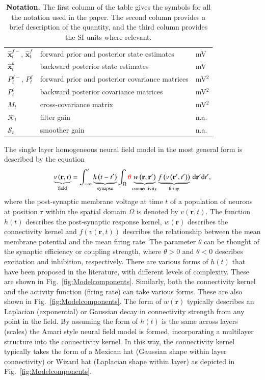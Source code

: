 \documentclass[review,authoryear,3p]{elsarticle}
\newcommand{\parham}[1]{\textcolor{red}{#1}}
\begin{document}
\begin{table}[!t]
\begin{tabular}{|l|l|l|}
	\hline
	$\hat{\mathbf{x}}_t^{f-}$, $\hat{\mathbf{x}}_t^f$ & forward prior and posterior state estimates & mV\\
	$\hat{\mathbf{x}}_t^{b}$ & backward posterior state estimates & mV\\
	$P^{f-}_t$, $P^f_t$  & forward prior and posterior covariance matrices & mV$^2$\\
	$P^b_t$ & backward posterior covariance matrices & mV$^2$\\
	$M_t$& cross-covariance matrix & mV$^2$\\
	$\mathcal K_{t} $ & filter gain & n.a.\\ 
	$\mathcal S_{t} $ & smoother gain & n.a.\\
	\hline
\end{tabular}
\caption{\textbf{Notation.} The first column of the table gives the symbols for all the notation used in the paper. The second column provides a brief description of the quantity, and the third column provides the SI units where relevant.}
\label{tab:Notation}
\end{table}  
\doublespacing

The single layer homogeneous neural field model in the most general form is described by the equation
\begin{equation}
	\label{FullDoubleIntModel} \underbrace{v\left(\mathbf{r},t\right)}_{\text{field}} =
	\int_{-\infty}^t 
	\underbrace{h\left(t - t'\right)}_{\text{synapse}} \int_\Omega
	\parham{\theta}\underbrace{w\left(\mathbf{r},\mathbf{r}'\right)}_{\text{connectivity}} 
	\underbrace{f\left( v\left( \mathbf{r}',t' \right)\right)}_{\text{firing}}
	\, \mathrm{d}\mathbf{r}'\mathrm{d}t',
\end{equation}
where the post-synaptic membrane voltage at time $t$ of a population of neurons at position $\mathbf r$ within the spatial domain $\Omega$ is denoted by $v\left(\mathbf r,t\right)$. The function $h(t)$ describes the post-synaptic response kernel, $w(\mathbf{r})$ describes the connectivity kernel and $f(v(\mathbf{r},t))$ describes the relationship between the mean membrane potential and the mean firing rate. The parameter $\theta$ can be thought of the synaptic efficiency or coupling strength, where $\theta>0$ and $\theta<0$ describes excitation and inhibition, respectively. There are various forms of $h(t)$ that have been proposed in the literature, with different levels of complexity. These are shown in Fig.~\ref{fig:Modelcomponents}. Similarly, both the connectivity kernel and the activity function (firing rate) can take various forms. These are also shown in Fig.~\ref{fig:Modelcomponents}. The form of $w(\mathbf{r})$ typically describes an Laplacian (exponential) or Gaussian decay in connectivity strength from any point in the field. By assuming the form of $h(t)$ is the same across layers (scales) the Amari style neural field model is formed, incorporating a multilayer structure into the connectivity kernel. In this way, the connectivity kernel typically takes the form of a Mexican hat (Gaussian shape within layer connectivity) or Wizard hat (Laplacian shape within layer) as depicted in Fig.~\ref{fig:Modelcomponents}.
\end{document}
